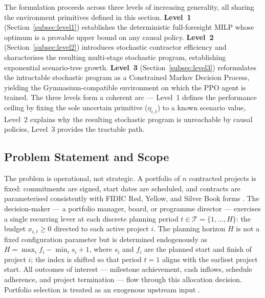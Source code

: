 
The formulation proceeds across three levels of increasing generality,
all sharing the environment primitives defined in this section.
\textbf{Level~1} (Section~\ref{subsec:level1}) establishes the deterministic
full-foresight MILP whose optimum is a provable upper bound on any causal
policy. \textbf{Level~2} (Section~\ref{subsec:level2}) introduces stochastic
contractor efficiency and characterises the resulting multi-stage stochastic
program, establishing exponential scenario-tree growth. \textbf{Level~3}
(Section~\ref{subsec:level3}) reformulates the intractable stochastic program
as a Constrained Markov Decision Process, yielding the Gymnasium-compatible
environment on which the PPO agent is trained. The three levels form a coherent
arc --- Level~1 defines the performance ceiling by fixing the sole uncertain
primitive ($\eta_{i,t}$) to a known scenario value, Level~2 explains why the
resulting stochastic program is unreachable by causal policies, Level~3
provides the tractable path.

\subsection{Problem Statement and Scope}
\label{subsec:problem_statement}

The problem is operational, not strategic. A portfolio of $n$ contracted
projects is fixed: commitments are signed, start dates are scheduled, and
contracts are parameterised consistently with FIDIC Red, Yellow, and Silver
Book forms \citep{FIDIC2017}. The decision-maker --- a portfolio manager,
board, or programme director --- exercises a single recurring lever at each
discrete planning period $t \in \mathcal{T} = \{1,\ldots,H\}$: the budget
$x_{i,t} \geq 0$ directed to each active project $i$.
The planning horizon $H$ is not a fixed configuration parameter but is
determined endogenously as $H = \max_i f_i- \min_i s_i + 1$, where $s_i$
and $f_i$ are the planned start and finish of project $i$; the index is
shifted so that period $t=1$ aligns with the earliest project start.
All outcomes of interest --- milestone achievement, cash inflows, schedule adherence, and
project termination --- flow through this allocation decision. Portfolio
selection is treated as an exogenous upstream input \citep{Archer1999}.

